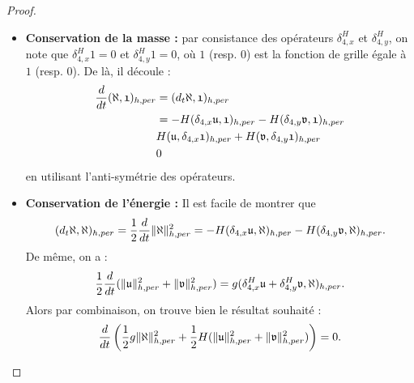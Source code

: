 \begin{proof}
\begin{itemize}
\item \textbf{Conservation de la masse :}
par consistance des opérateurs $\delta_{4,x}^H$ et $\delta_{4,y}^H$, on note que $\delta_{4,x}^H \mathfrak{1} = \mathfrak{0}$ et $\delta_{4,y}^H \mathfrak{1} = \mathfrak{0}$, où $\mathfrak{1}$ (resp. $\mathfrak{0}$) est la fonction de grille égale à $1$ (resp. $0$). De là, il découle :
\begin{align*}
\dfrac{d}{dt} (\aleph, \mathfrak{1})_{h,per} & = ( d_t \aleph, \mathfrak{1} )_{h,per} \\
	& = - H (\delta_{4,x} \mathfrak{u}, \mathfrak{1})_{h,per} - H (\delta_{4,y} \mathfrak{v}, \mathfrak{1})_{h,per} \\
	& H (\mathfrak{u}, \delta_{4,x} \mathfrak{1})_{h,per} + H (\mathfrak{v}, \delta_{4,y} \mathfrak{1})_{h,per} \\
	& 0
\end{align*}
en utilisant l'anti-symétrie des opérateurs.

\item \textbf{Conservation de l'énergie :}
Il est facile de montrer que 
\begin{equation}
(d_t \aleph, \aleph)_{h,per} = \dfrac{1}{2} \dfrac{d}{dt} \| \aleph \|^2_{h,per} = - H (\delta_{4,x} \mathfrak{u}, \aleph)_{h,per} - H (\delta_{4,y} \mathfrak{v}, \aleph)_{h,per}.
\end{equation}
De même, on a :
\begin{equation}
\dfrac{1}{2} \dfrac{d}{dt} (\| \mathfrak{u} \|_{h,per}^2 + \| \mathfrak{v} \|_{h,per}^2) = g (\delta_{4,x}^H \mathfrak{u}+\delta_{4,y}^H \mathfrak{v}, \aleph)_{h,per}.
\end{equation}
Alors par combinaison, on trouve bien le résultat souhaité :
\begin{equation}
\dfrac{d}{dt} \left( \dfrac{1}{2} g \| \aleph \|_{h,per}^2 + \dfrac{1}{2} H ( \| \mathfrak{u} \|_{h,per}^2 +  \| \mathfrak{v} \|_{h,per}^2) \right) = 0.
\end{equation}
\end{itemize}
\end{proof}

